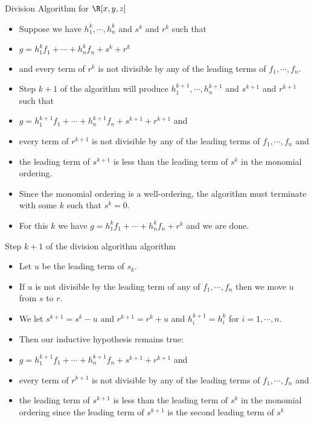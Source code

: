 \documentclass[handout]{beamer}
\begin{document}
\begin{frame}{Division Algorithm for $\R[x,y,z]$}

\begin{itemize}
  \item Suppose we have $h_1^k, \cdots, h_n^k$ and $s^k$ and $r^k$ such that
  \item $g = h_1^k f_1 + \cdots + h_n^k f_n + s^k + r^k$
  \item and every term of $r^k$ is not divisible by any of the leading terms of $f_1,\cdots, f_n$.
  \item Step $k+1$ of the algorithm will produce $h_1^{k+1} , \cdots,  h_n^{k+1}$ and $s^{k+1}$ and $r^{k+1}$ such that
  \item $g = h_1^{k+1} f_1 + \cdots + h_n^{k+1} f_n + s^{k+1} + r^{k+1}$ and
  \item every term of $r^{k+1}$ is not divisible by any of the leading terms of $f_1,\cdots, f_n$ and
  \item the leading term of $s^{k+1}$ is less than the leading term of $s^k$ in the monomial ordering.
  \item Since the monomial ordering is a well-ordering, the algorithm must terminate with some $k$ such that $s^k = 0$.
  \item For this $k$ we have $g = h_1^k f_1 + \cdots + h_n^k f_n + r^k$ and we are done.
\end{itemize}

\end{frame}

\begin{frame}{Step $k+1$ of the division algorithm algorithm}

\begin{itemize}
  \item Let $u$ be the leading term of $s_k$.
  \item If $u$ is not divisible by the leading term of any of $f_1,\cdots,f_n$ then we move $u$ from $s$ to $r$.
  \item We let $s^{k+1} = s^k - u$ and $r^{k+1} = r^k + u$ and $h_i^{k+1} = h_i^k$ for $i=1,\cdots,n$.
  \item Then our inductive hypothesis remains true:
  \item $g = h_1^{k+1} f_1 + \cdots + h_n^{k+1} f_n + s^{k+1} + r^{k+1}$ and
  \item every term of $r^{k+1}$ is not divisible by any of the leading terms of $f_1,\cdots, f_n$ and
  \item the leading term of $s^{k+1}$ is less than the leading term of $s^k$ in the monomial ordering since the leading
  term of $s^{k+1}$ is the second leading term of $s^k$
\end{itemize}

\end{frame}
\end{document}
